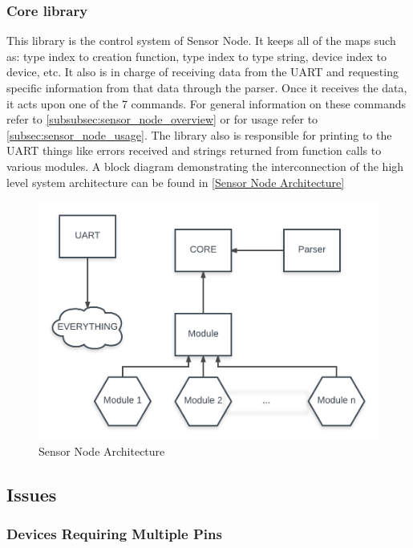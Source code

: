 \documentclass{article}
\begin{document}
\subsubsection{Core library}
\label{subsubsec:sensor_node_core_library}

This library is the control system of Sensor Node. It keeps all of the maps such as: type index to creation function, type index to type string, device index to device, etc. It also is in charge of receiving data from the UART and requesting specific information from that data through the parser. Once it receives the data, it acts upon one of the 7 commands. For general information on these commands refer to \autoref{subsubsec:sensor_node_overview} or for usage refer to \autoref{subsec:sensor_node_usage}. The library also is responsible for printing to the UART things like errors received and strings returned from function calls to various modules. A block diagram demonstrating the interconnection of the high level system architecture can be found in \autoref{Sensor Node Architecture}

\begin{figure}[h!]
    \centering
        \includegraphics[width=\linewidth]{Sensor_Node_Architecture.png}
        \caption{Sensor Node Architecture}
        \label{Sensor Node Architecture}
\end{figure}

\subsection{Issues}
\label{subsec:sensor_node_issues}

\subsubsection{Devices Requiring Multiple Pins}
\label{subsubsec:sensor_node_multiple_pins}
\end{document}
